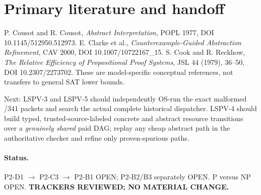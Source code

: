 \documentclass[11pt]{article}
\begin{document}
\section*{Primary literature and handoff}
P. Cousot and R. Cousot, \emph{Abstract Interpretation}, POPL 1977, DOI 10.1145/512950.512973. E. Clarke et al., \emph{Counterexample-Guided Abstraction Refinement}, CAV 2000, DOI 10.1007/10722167\_15. S. Cook and R. Reckhow, \emph{The Relative Efficiency of Propositional Proof Systems}, JSL 44 (1979), 36--50, DOI 10.2307/2273702. These are model-specific conceptual references, not transfers to general SAT lower bounds.

Next: LSPV-3 and LSPV-5 should independently OS-run the exact malformed /341 packets and search the actual complete historical dispatcher. LSPV-4 should build typed, trusted-source-labeled concrete and abstract resource transitions over a \emph{genuinely shared} paid DAG; replay any cheap abstract path in the authoritative checker and refine only proven-spurious paths.

\paragraph{Status.} P2-D1 $\to$ P2-C3 $\to$ P2-B1 OPEN; P2-B2/B3 separately OPEN. P versus NP OPEN. \textbf{TRACKERS REVIEWED; NO MATERIAL CHANGE.}
\end{document}

